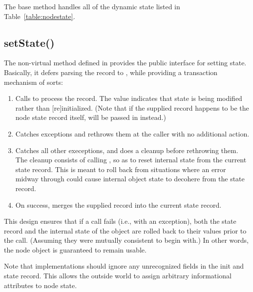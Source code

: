   The base  method handles all of the dynamic
  state listed in Table~\ref{table:nodestate}.

\subsection{setState()}
\label{sec:setState}
\label{sec:state-rollback}

  The non-virtual  method defined in  provides the
  public interface for setting state. Basically, it defers parsing the record
  to , while providing a transaction mechanism of sorts:

  \begin{enumerate}

  \item Calls  to process the record. The
     value indicates that state is being modified rather than
    [re]initialized. (Note that if the supplied record happens to be the node
    state record itself,  will be passed in instead.)

  \item Catches  exceptions and rethrows them at
    the caller with no additional action.

  \item Catches all other execeptions, and does a cleanup before rethrowing
    them. The cleanup consists of calling , so
    as to reset internal state from the current state record. This is meant to
    roll back from situations where an error midway through 
    could cause internal object state to decohere from the state record.

  \item On success, merges the supplied record into the current state record.

  \end{enumerate}

  This design ensures that if a  call fails (i.e., with an
  exception), both the state record and the internal state of the object are
  rolled back to their values prior to the call. (Assuming they were mutually
  consistent to begin with.) In other words, the node object is guaranteed to
  remain usable.

  Note that implementations  should ignore any unrecognized
  fields in the init and state record. This allows the outside world to assign
  arbitrary informational attributes to node state.

